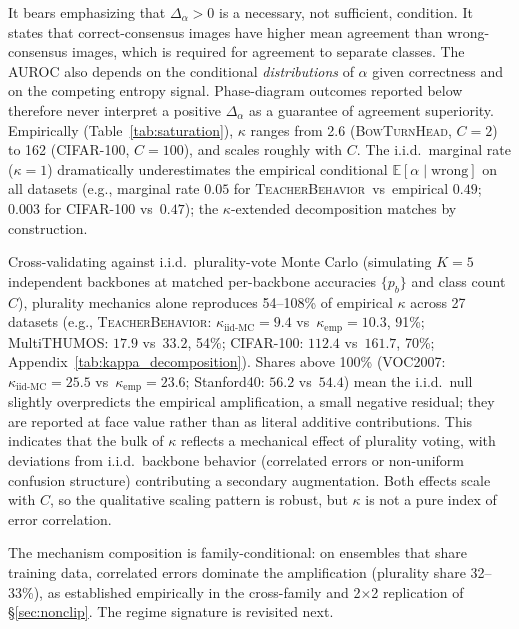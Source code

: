 \documentclass[a4paper,fleqn]{cas-sc}
\newcommand{\tb}{\textsc{TeacherBehavior}}
\newcommand{\bth}{\textsc{BowTurnHead}}
\begin{document}
It bears emphasizing that $\Delta_\alpha > 0$ is a necessary, not sufficient, condition. It states that correct-consensus images have higher mean agreement than wrong-consensus images, which is required for agreement to separate classes. The AUROC also depends on the conditional \emph{distributions} of $\alpha$ given correctness and on the competing entropy signal.
Phase-diagram outcomes reported below therefore never interpret a positive $\Delta_\alpha$ as a guarantee of agreement superiority.
Empirically (Table~\ref{tab:saturation}), $\kappa$ ranges from 2.6 (\bth, $C{=}2$) to 162 (CIFAR-100, $C{=}100$), and scales roughly with $C$.
The i.i.d.\ marginal rate ($\kappa{=}1$) dramatically underestimates the empirical conditional $\mathbb{E}[\alpha \mid \text{wrong}]$ on all datasets (e.g., marginal rate $0.05$ for \tb\ vs~empirical $0.49$; $0.003$ for CIFAR-100 vs~$0.47$); the $\kappa$-extended decomposition matches by construction.

Cross-validating against i.i.d.\ plurality-vote Monte Carlo (simulating $K{=}5$ independent backbones at matched per-backbone accuracies $\{p_b\}$ and class count $C$), plurality mechanics alone reproduces 54--108\% of empirical $\kappa$ across 27 datasets (e.g., \tb: $\kappa_{\text{iid-MC}}=9.4$ vs~$\kappa_{\text{emp}}=10.3$, 91\%; MultiTHUMOS: $17.9$ vs~$33.2$, 54\%; CIFAR-100: $112.4$ vs~$161.7$, 70\%; Appendix~\ref{tab:kappa_decomposition}).
Shares above 100\% (VOC2007: $\kappa_{\text{iid-MC}}=25.5$ vs~$\kappa_{\text{emp}}=23.6$; Stanford40: $56.2$ vs~$54.4$) mean the i.i.d.\ null slightly overpredicts the empirical amplification, a small negative residual; they are reported at face value rather than as literal additive contributions.
This indicates that the bulk of $\kappa$ reflects a mechanical effect of plurality voting, with deviations from i.i.d.\ backbone behavior (correlated errors or non-uniform confusion structure) contributing a secondary augmentation. Both effects scale with $C$, so the qualitative scaling pattern is robust, but $\kappa$ is not a pure index of error correlation.

The mechanism composition is family-conditional: on ensembles that share training data, correlated errors dominate the amplification (plurality share 32--33\%), as established empirically in the cross-family and 2$\times$2 replication of \S\ref{sec:nonclip}. The regime signature is revisited next.
\end{document}
